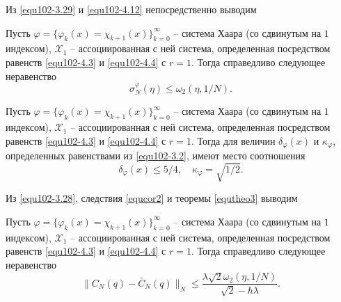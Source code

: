Из \eqref{equ102-3.29} и \eqref{equ102-4.12} непосредственно выводим
\begin{corollary}
  Пусть $\varphi=\{\varphi_k(x)=\chi_{k+1}(x)\}_{k=0}^\infty$ -- система Хаара (со сдвинутым на $1$ индексом), $\mathcal{ X}_1$ -- ассоциированная с ней система, определенная посредством равенств \eqref{equ102-4.3} и \eqref{equ102-4.4} с $r=1$.
Тогда   справедливо следующее неравенство
$$\sigma_N^{\varphi}(\eta)\le \omega_2(\eta,1/N).$$
\end{corollary}
\begin{theorem}\label{equtheo3}
  Пусть $\varphi=\{\varphi_k(x)=\chi_{k+1}(x)\}_{k=0}^\infty$ -- система Хаара (со сдвинутым на $1$ индексом), $\mathcal{ X}_1$ -- ассоциированная с ней система, определенная посредством равенств \eqref{equ102-4.3} и \eqref{equ102-4.4} с $r=1$. Тогда для величин $\delta_\varphi(x)$ и $\kappa_\varphi$, определенных равенствами из \eqref{equ102-3.2}, имеют место соотношения
 $$
\delta_\varphi(x)\le 5/4,\quad\kappa_{\varphi}=\sqrt{1/2}.
$$
\end{theorem}

Из \eqref{equ102-3.28}, следствия \ref{equcor2} и теоремы \ref{equtheo3} выводим
\begin{corollary}
  Пусть $\varphi=\{\varphi_k(x)=\chi_{k+1}(x)\}_{k=0}^\infty$ -- система Хаара (со сдвинутым на $1$ индексом), $\mathcal{ X}_1$ -- ассоциированная с ней система, определенная посредством равенств \eqref{equ102-4.3} и \eqref{equ102-4.4} с $r=1$.
Тогда   справедливо следующее неравенство
$$\|C_N(q)-\bar C_N(q)\|_N\le \frac{\lambda \sqrt{2}\omega_2(\eta,1/N)}{\sqrt{2}-h\lambda}.$$
\end{corollary}




